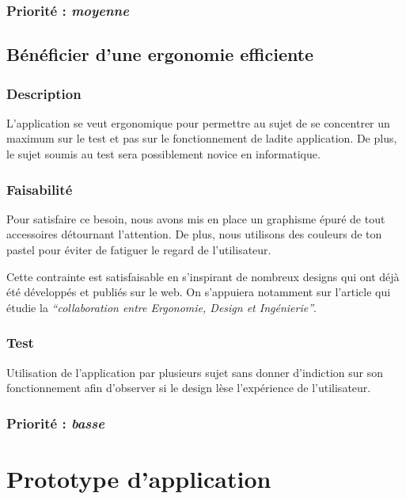 \subsubsection{Priorité : \textit{moyenne}}

\subsection{Bénéficier d’une ergonomie efficiente}

\subsubsection{Description}

L’application se veut ergonomique pour permettre au sujet de se concentrer un maximum sur le test et pas sur le fonctionnement de ladite application. De plus, le sujet soumis au test sera possiblement novice en informatique.

\subsubsection{Faisabilité}

Pour satisfaire ce besoin, nous avons mis en place un graphisme épuré de tout accessoires détournant l’attention. De plus, nous utilisons des couleurs de ton pastel pour éviter de fatiguer le regard de l’utilisateur.

Cette contrainte est satisfaisable en s’inspirant de nombreux designs qui ont déjà été développés et publiés sur le web. On s’appuiera notamment sur l’article \cite{lente2014scenariser} qui étudie la \textit{“collaboration entre Ergonomie, Design et Ingénierie”}.

\subsubsection{Test}

Utilisation de l’application par plusieurs sujet sans donner d’indiction sur son fonctionnement afin d’observer si le design lèse l'expérience de l’utilisateur.

\subsubsection{Priorité : \textit{basse}}

\section{Prototype d'application}

